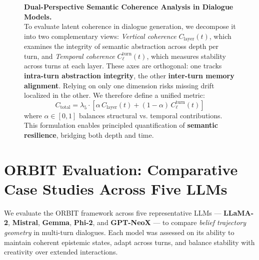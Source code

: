 \documentclass[11pt]{article}
\begin{document}
\begin{figure}[htp!]
    \caption{\textbf{Dual-Perspective Semantic Coherence Analysis in Dialogue Models.}\\
    To evaluate latent coherence in dialogue generation, we decompose it into two complementary views: 
    \emph{Vertical coherence} \( C_{\mathrm{layer}}(t) \), which examines the integrity of semantic abstraction across depth per turn, and 
    \emph{Temporal coherence} \( C^{\mathrm{turn}}_{\ell}(t) \), which measures stability across turns at each layer. 
    These axes are orthogonal: one tracks \textbf{intra-turn abstraction integrity}, the other \textbf{inter-turn memory alignment}. 
    Relying on only one dimension risks missing drift localized in the other. 
    We therefore define a unified metric:
    \[
    \boxed{C_{\text{total}} = \lambda_5 \cdot \left[\alpha \, C_{\mathrm{layer}}(t) + (1 - \alpha) \, C^{\mathrm{turn}}_{\ell}(t)\right]}
    \]
    where \( \alpha \in [0,1] \) balances structural vs. temporal contributions. 
    This formulation enables principled quantification of \textbf{semantic resilience}, bridging both depth and time.}
    \label{fig:semantic_coherence_total}
\end{figure}


\clearpage
\newpage




\section{ORBIT Evaluation: Comparative Case Studies Across Five LLMs}

We evaluate the ORBIT framework across five representative LLMs --- \textbf{LLaMA-2}, \textbf{Mistral}, \textbf{Gemma}, \textbf{Phi-2}, and \textbf{GPT-NeoX} --- to compare \emph{belief trajectory geometry} in multi-turn dialogues. Each model was assessed on its ability to maintain coherent epistemic states, adapt across turns, and balance stability with creativity over extended interactions.
\end{document}
